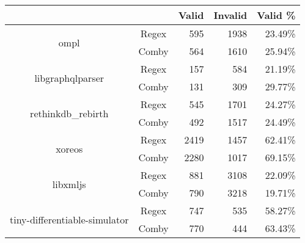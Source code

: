 \documentclass[sigconf,review, anonymous]{acmart}
\begin{document}
{\begin{table}[hbtp]
{\begin{tabular}{|c|c|c|r|r|r|}
\hline
 & \multicolumn{2}{c|}{} & \textbf{Valid} & \textbf{Invalid} & \textbf{Valid \%}  \\ \hline
\multirow{2}{*}{ompl} & \multicolumn{2}{c|}{Regex} & 595 \hspace{8pt} & 1938 \hspace{8pt} & 23.49\%  \\\cline{2-6}
    & \multicolumn{2}{c|}{Comby} & 564 \hspace{8pt} & 1610 \hspace{8pt} & 25.94\% \\ \hline
\multirow{2}{*}{libgraphqlparser} & \multicolumn{2}{c|}{Regex} & 157 \hspace{8pt} & 584 \hspace{8pt} & 21.19\% \\\cline{2-6}
    & \multicolumn{2}{c|}{Comby} & 131 \hspace{8pt} & 309 \hspace{8pt} & 29.77\% \\ \hline
\multirow{2}{*}{rethinkdb\_rebirth} & \multicolumn{2}{c|}{Regex} & 545 \hspace{8pt} & 1701 \hspace{8pt} & 24.27\% \\\cline{2-6}
    & \multicolumn{2}{c|}{Comby} & 492 \hspace{8pt} & 1517 \hspace{8pt} & 24.49\% \\ \hline
    
\multirow{2}{*}{xoreos} & \multicolumn{2}{c|}{Regex} & 2419 \hspace{8pt} & 1457 \hspace{8pt} & 62.41\% \\\cline{2-6}
    & \multicolumn{2}{c|}{Comby} & 2280 \hspace{8pt} & 1017 \hspace{8pt} & 69.15\% \\ \hline
\multirow{2}{*}{libxmljs} & \multicolumn{2}{c|}{Regex} & 881 \hspace{8pt} & 3108 \hspace{8pt} & 22.09\% \\\cline{2-6}
    & \multicolumn{2}{c|}{Comby} & 790 \hspace{8pt} & 3218 \hspace{8pt} & 19.71\% \\ \hline
\multirow{2}{*}{tiny-differentiable-simulator} & \multicolumn{2}{c|}{Regex} & 747 \hspace{8pt} & 535 \hspace{8pt} & 58.27\% \\\cline{2-6}
    & \multicolumn{2}{c|}{Comby} & 770 \hspace{8pt} & 444 \hspace{8pt} & 63.43\% \\ \hline


\end{tabular}}
\end{table}}
\end{document}
